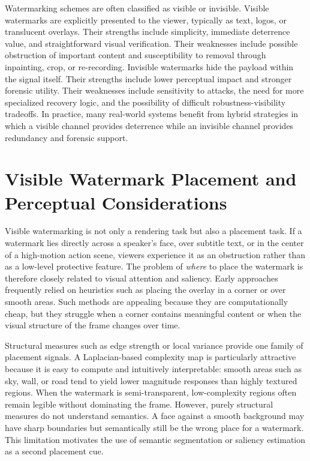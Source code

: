 \documentclass[12pt,oneside]{report}
\begin{document}
Watermarking schemes are often classified as visible or invisible. Visible watermarks are explicitly presented to the viewer, typically as text, logos, or translucent overlays. Their strengths include simplicity, immediate deterrence value, and straightforward visual verification. Their weaknesses include possible obstruction of important content and susceptibility to removal through inpainting, crop, or re-recording. Invisible watermarks hide the payload within the signal itself. Their strengths include lower perceptual impact and stronger forensic utility. Their weaknesses include sensitivity to attacks, the need for more specialized recovery logic, and the possibility of difficult robustness-visibility tradeoffs. In practice, many real-world systems benefit from hybrid strategies in which a visible channel provides deterrence while an invisible channel provides redundancy and forensic support.

\section{Visible Watermark Placement and Perceptual Considerations}
Visible watermarking is not only a rendering task but also a placement task. If a watermark lies directly across a speaker's face, over subtitle text, or in the center of a high-motion action scene, viewers experience it as an obstruction rather than as a low-level protective feature. The problem of \textit{where} to place the watermark is therefore closely related to visual attention and saliency. Early approaches frequently relied on heuristics such as placing the overlay in a corner or over smooth areas. Such methods are appealing because they are computationally cheap, but they struggle when a corner contains meaningful content or when the visual structure of the frame changes over time.

Structural measures such as edge strength or local variance provide one family of placement signals. A Laplacian-based complexity map is particularly attractive because it is easy to compute and intuitively interpretable: smooth areas such as sky, wall, or road tend to yield lower magnitude responses than highly textured regions. When the watermark is semi-transparent, low-complexity regions often remain legible without dominating the frame. However, purely structural measures do not understand semantics. A face against a smooth background may have sharp boundaries but semantically still be the wrong place for a watermark. This limitation motivates the use of semantic segmentation or saliency estimation as a second placement cue.
\end{document}
